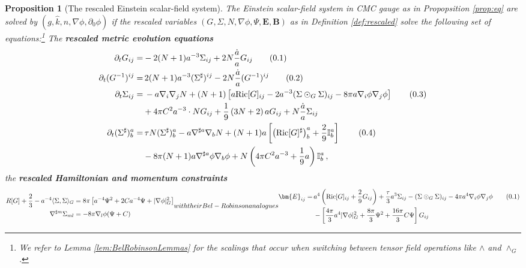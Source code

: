 \documentclass[11pt,leqno,textwidth=10cm]{amsart}
\numberwithin{equation}{section}
\theoremstyle{definition}
\theoremstyle{plain}
\newtheorem{prop}[definition]{Proposition}
\newcommand{\1}{\mathbbm{1}}
\newcommand{\I}{\mathbb{I}}
\newcommand{\Ric}{\text{\normalfont{Ric}}}
\newcommand{\del}{\partial}
\newcommand{\numberthis}{\addtocounter{equation}{1}\tag{\theequation}}
\renewcommand{\theequation}{\arabic{section}.\arabic{equation}}
\newcommand{\RE}{\bm{E}}
\newcommand{\RB}{\bm{B}}
\newcommand{\change}[1]{\color{black}#1\color{black}}
\begin{document}
\begin{prop}[The rescaled Einstein scalar-field system]\label{prop:REEq}
The Einstein scalar-field system in CMC gauge as in Propopsition \ref{prop:eq} are solved by  $(g,\hat{k},n,\nabla\phi,\del_0\phi)$ if the rescaled variables $(G,\Sigma,N,\nabla\phi,\Psi,\RE,\RB)$ as in Definition \ref{def:rescaled} solve the following set of equations:\footnote{\change{We refer to Lemma \ref{lem:BelRobinsonLemmas} for the scalings that occur when switching between tensor field operations like $\wedge$ and $\wedge_G$.}} The \textbf{rescaled metric evolution equations}
\begin{subequations}
\begin{align*}
\del_tG_{ij}=&-2(N+1)a^{-3}\Sigma_{ij}+2N\frac{\dot{a}}{a}G_{ij} \numberthis\label{eq:REEqG}\\
\del_t(G^{-1})^{ij}=&\,2(N+1)a^{-3}(\Sigma^\sharp)^{ij}-2N\frac{\dot{a}}{a}(G^{-1})^{ij}\numberthis\label{eq:REEqG-1}\\
\del_t\Sigma_{ij}=&\,-a\nabla_i\nabla_jN+(N+1)\left[a\Ric[G]_{ij}-2a^{-3}(\Sigma\odot_G\Sigma)_{ij}-8\pi a\nabla_i\phi\nabla_j\phi\right]\numberthis\label{eq:REEqSigma}\\
&+4\pi C^2a^{-3}\cdot NG_{ij}+\frac19\left(3N+2\right)aG_{ij}+N\frac{\dot{a}}{a}\Sigma_{ij}\\
\del_t(\Sigma^\sharp)^a_b=&\,\tau N(\Sigma^\sharp)^a_b-a\nabla^{\sharp a}\nabla_bN+(N+1)a\left[\left(\Ric[G]^\sharp\right)^a_b+\frac 29\I^a_b\right]\,\numberthis\label{eq:REEqSigmaSharp}\\
&-8\pi (N+1)a\nabla^{\sharp a}\phi\nabla_b\phi+N\left(4\pi C^2a^{-3}+\frac19 a\right)\I^a_b\,,
\end{align*}
\end{subequations}
the \textbf{rescaled Hamiltonian and momentum constraints}
\begin{subequations}
\begin{align}
R[G]+\frac23-a^{-4}\langle\Sigma,\Sigma\rangle_G&=8\pi\left[a^{-4}\Psi^2+2Ca^{-4}\Psi+\lvert\nabla\phi\rvert_G^2\right] \label{eq:REEqHam}\\
\nabla^{\sharp m}\Sigma_{ml}&=-8\pi\nabla_l\phi(\Psi+C) \label{eq:REEqMom}
\end{align}
with their Bel-Robinson analogues
\begin{align*}
\RE_{ij}=&\,a^4\left(\Ric[G]_{ij}+\frac29G_{ij}\right)+\frac{\tau}3a^3\Sigma_{ij}-(\Sigma\odot_G\Sigma)_{ij}-4\pi a^4\nabla_i\phi\nabla_j\phi\numberthis\label{eq:REEqConstrE}\\
&\,-\left[\frac{4\pi}3a^4\lvert\nabla\phi\rvert_G^2+\frac{8\pi}3\Psi^2+\frac{16\pi}3C\Psi\right]G_{ij}\\

\end{align*}
\end{subequations}
\end{prop}
\end{document}

